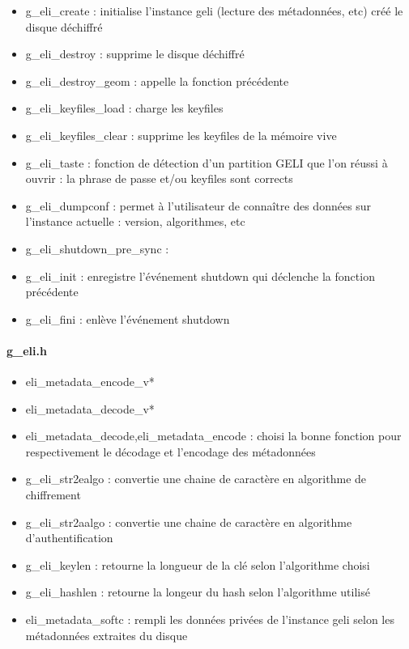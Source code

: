 \begin{itemize}
	\item g\_eli\_create : initialise l'instance geli (lecture des métadonnées, etc)
		créé le disque déchiffré
	\item g\_eli\_destroy : supprime le disque déchiffré
	\item g\_eli\_destroy\_geom : appelle la fonction précédente
	\item g\_eli\_keyfiles\_load : charge les keyfiles
	\item g\_eli\_keyfiles\_clear : supprime les keyfiles de la mémoire vive
	\item g\_eli\_taste : fonction de détection d'un partition GELI que l'on réussi à
		ouvrir : la phrase de passe et/ou keyfiles sont corrects
	\item g\_eli\_dumpconf : permet à l'utilisateur de connaître des données sur 
		l'instance actuelle : version, algorithmes, etc
	\item g\_eli\_shutdown\_pre\_sync : 
	\item g\_eli\_init : enregistre l'événement shutdown qui déclenche la fonction
		précédente
	\item g\_eli\_fini : enlève l'événement shutdown
\end{itemize}

\paragraph{g\_eli.h}
\begin{itemize}
	\item eli\_metadata\_encode\_v*
	\item eli\_metadata\_decode\_v*
	\item eli\_metadata\_decode,eli\_metadata\_encode : choisi la bonne fonction pour 
		respectivement le décodage et l'encodage des métadonnées
	\item g\_eli\_str2ealgo : convertie une chaine de caractère en algorithme de 
		chiffrement
	\item g\_eli\_str2aalgo : convertie une chaine de caractère en algorithme 
		d'authentification
	\item g\_eli\_keylen : retourne la longueur de la clé selon l'algorithme choisi
	\item g\_eli\_hashlen : retourne la longeur du hash selon l'algorithme utilisé
	\item eli\_metadata\_softc : rempli les données privées de l'instance geli 
		selon les métadonnées extraites du disque
\end{itemize}

